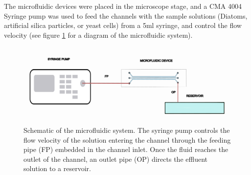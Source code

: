 \documentclass[letterpaper,12pt,oneside]{book}
\begin{document}
The microfluidic devices were placed in the microscope stage, and a CMA 4004 Syringe pump was used to feed the channels with the sample solutions (Diatoms, artificial silica particles, or yeast cells) from a 5ml syringe, and control the flow velocity (see figure \ref{microfluidicsystem} for a diagram of the microfluidic system).
\begin{figure}[H]
    \centering
    \includegraphics[scale=0.55]{Diatomsexperimentalmethods/Samplepreparation/Screen Shot 2024-01-18 at 12.50.20 PM.png}
    \caption{Schematic of the microfluidic system. The syringe pump controls the flow velocity of the solution entering the channel through the feeding pipe (FP) embedded in the channel inlet. Once the fluid reaches the outlet of the channel, an outlet pipe (OP) directs the effluent solution to a reservoir.}
    \label{microfluidicsystem}
\end{figure}


\newline %
\end{document}
